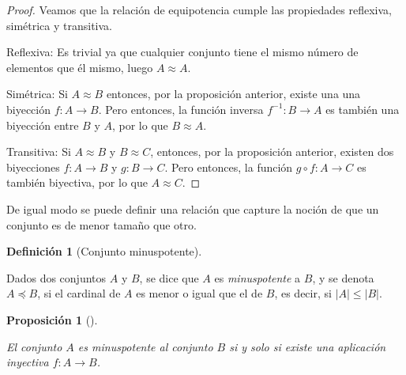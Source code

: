 \documentclass[
  a4paper,
]{scrreport}
\theoremstyle{definition}
\theoremstyle{plain}
\theoremstyle{plain}
\theoremstyle{definition}
\newtheorem{definition}{Definición}[chapter]
\theoremstyle{plain}
\newtheorem{proposition}{Proposición}[chapter]
\theoremstyle{remark}
\begin{document}
\begin{tcolorbox}[enhanced jigsaw, toptitle=1mm, rightrule=.15mm, colbacktitle=quarto-callout-note-color!10!white, bottomtitle=1mm, breakable, leftrule=.75mm, titlerule=0mm, coltitle=black, opacityback=0, colback=white, toprule=.15mm, title=\textcolor{quarto-callout-note-color}{\faInfo}\hspace{0.5em}{Demostración}, arc=.35mm, bottomrule=.15mm, colframe=quarto-callout-note-color-frame, left=2mm, opacitybacktitle=0.6]

\begin{proof}

Veamos que la relación de equipotencia cumple las propiedades reflexiva,
simétrica y transitiva.

Reflexiva: Es trivial ya que cualquier conjunto tiene el mismo número de
elementos que él mismo, luego \(A\approx A\).

Simétrica: Si \(A\approx B\) entonces, por la proposición anterior,
existe una una biyección \(f:A\longrightarrow B\). Pero entonces, la
función inversa \(f^{-1}:B\longrightarrow A\) es también una biyección
entre \(B\) y \(A\), por lo que \(B\approx A\).

Transitiva: Si \(A\approx B\) y \(B\approx C\), entonces, por la
proposición anterior, existen dos biyecciones \(f:A\longrightarrow B\) y
\(g:B\longrightarrow C\). Pero entonces, la función
\(g\circ f:A\longrightarrow C\) es también biyectiva, por lo que
\(A\approx C\).

\end{proof}

\end{tcolorbox}

De igual modo se puede definir una relación que capture la noción de que
un conjunto es de menor tamaño que otro.

\begin{definition}[Conjunto
minuspotente]\protect\hypertarget{def-conjuntos-minuspotentes}{}\label{def-conjuntos-minuspotentes}

Dados dos conjuntos \(A\) y \(B\), se dice que \(A\) es
\emph{minuspotente} a \(B\), y se denota \(A\preceq B\), si el cardinal
de \(A\) es menor o igual que el de \(B\), es decir, si
\(|A| \leq |B|\).

\end{definition}

\begin{proposition}[]\protect\hypertarget{prp-inyeccion-conjuntos-minuspotentes}{}\label{prp-inyeccion-conjuntos-minuspotentes}

El conjunto \(A\) es minuspotente al conjunto \(B\) si y solo si existe
una aplicación inyectiva \(f:A\rightarrow B\).

\end{proposition}
\end{document}
